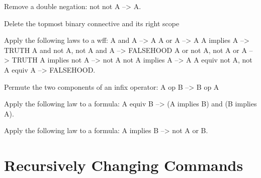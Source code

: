 \begin{description}
\item[DNEG]  
Remove a double negation:
   not not A --> A.

\item[DR]  
Delete the topmost binary connective and its right scope

\item[MRG]  
Apply the following laws to a wff:
   A and A --> A
   A or A --> A
   A implies A --> TRUTH
   A and not A, not A and A --> FALSEHOOD
   A or not A, not A or A --> TRUTH
   A implies not A --> not A
   not A implies A --> A
   A equiv not A, not A equiv A --> FALSEHOOD.

\item[PMUT]  
Permute the two components of an infix operator:
   A op B --> B op A

\item[SUBEQ]  
Apply the following law to a formula:
  A equiv B --> (A implies B) and (B implies A).

\item[SUBIM]  
Apply the following law to a formula:
   A implies B --> not A or B.
\item
\end{description}

\section{Recursively Changing Commands}

